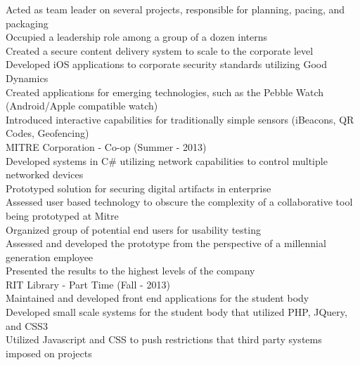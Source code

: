\documentclass{article}
\begin{document}
Acted as team leader on several projects, responsible for planning, pacing, and packaging \\
Occupied a leadership role among a group of a dozen interns \\
Created a secure content delivery system to scale to the corporate level \\
Developed iOS applications to corporate security standards utilizing Good Dynamics \\
Created applications for emerging technologies, such as the Pebble Watch (Android/Apple compatible watch) \\
Introduced interactive capabilities for traditionally simple sensors (iBeacons, QR Codes, Geofencing) \\
{\large MITRE Corporation - Co-op (Summer - 2013) } \\
Developed systems in C\# utilizing network capabilities to control multiple networked devices \\
Prototyped solution for securing digital artifacts in enterprise \\
Assessed user based technology to obscure the complexity of a collaborative tool being prototyped at Mitre \\
Organized group of potential end users for usability testing \\
Assessed and developed the prototype from the perspective of a millennial generation employee \\
Presented the results to the highest levels of the company \\
{\large RIT Library - Part Time (Fall - 2013) } \\
Maintained and developed front end applications for the student body \\
Developed small scale systems for the student body that utilized PHP, JQuery, and CSS3 \\
Utilized Javascript and CSS to push restrictions that third party systems imposed on projects \\
\end{document}
